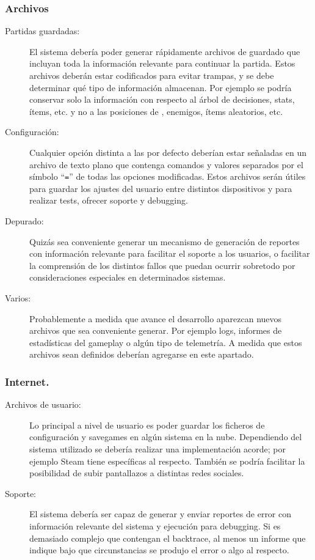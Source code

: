 \subsubsection{Archivos}
\begin{description}
\item[Partidas guardadas:] El sistema debería poder generar rápidamente archivos de guardado que incluyan toda la información relevante para continuar la partida. Estos archivos deberán estar codificados para evitar trampas, y se debe determinar qué tipo de información almacenan. Por ejemplo se podría conservar solo la información con respecto al árbol de decisiones, stats, ítems, etc. y no a las posiciones de , enemigos, ítems aleatorios, etc.

\item[Configuración:] Cualquier opción distinta a las por defecto deberían estar señaladas en un archivo de texto plano que contenga comandos y valores separados por el símbolo “\texttt{=}” de todas las opciones modificadas.
Estos archivos serán útiles para guardar los ajustes del usuario entre distintos dispositivos y para realizar tests, ofrecer soporte y debugging.

\item[Depurado:] Quizás sea conveniente generar un mecanismo de generación de reportes con información relevante para facilitar el soporte a los usuarios, o facilitar la comprensión de los distintos fallos que puedan ocurrir sobretodo por consideraciones especiales en determinados sistemas.

\item[Varios:] Probablemente a medida que avance el desarrollo aparezcan nuevos archivos que sea conveniente generar. Por ejemplo logs, informes de estadísticas del gameplay o algún tipo de telemetría. A medida que estos archivos sean definidos deberían agregarse en este apartado.
\end{description}

\subsubsection{Internet.}
\begin{description}
\item[Archivos de usuario:] Lo principal a nivel de usuario es poder guardar los ficheros de configuración y savegames en algún sistema en la nube. Dependiendo del sistema utilizado se debería realizar una implementación acorde; por ejemplo Steam tiene  específicas al respecto. También se podría facilitar la posibilidad de subir pantallazos a distintas redes sociales.

\item[Soporte:] El sistema debería ser capaz de generar y enviar reportes de error con información relevante del sistema y ejecución para debugging. Si es demasiado complejo que contengan el backtrace, al menos un informe que indique bajo que circunstancias se produjo el error o algo al respecto.
\end{description}

